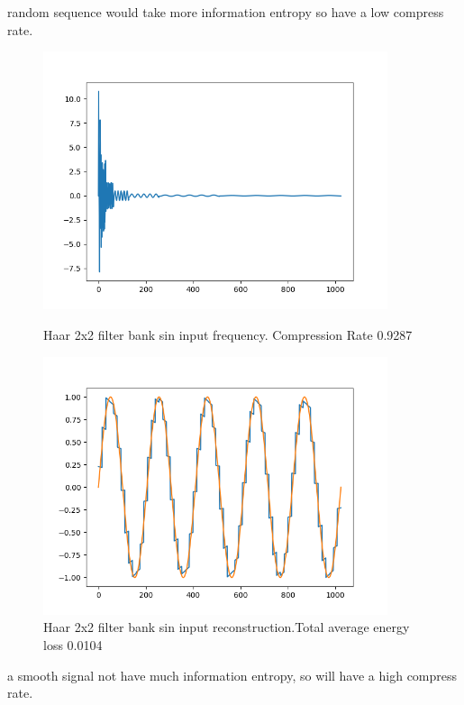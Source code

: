 \documentclass{article}
\theoremstyle{definition} %
\begin{document}
random sequence would take more information entropy so have a low compress rate.
\begin{figure}[ht!]
    \centering
    \begin{minipage}{0.45\textwidth}
        \centering
        \includegraphics[width=0.9\textwidth]{fig/HaarAugmented1D_sin_freq.png} %
        \caption{Haar 2x2 filter bank sin input frequency. Compression Rate 0.9287}
        \label{fig:Haar_sin}
    \end{minipage}\hfill
    \begin{minipage}{0.45\textwidth}
        \centering
        \includegraphics[width=0.9\textwidth]{fig/HaarAugmented1D_sin_rec.png} %
        \caption{Haar 2x2 filter bank sin input reconstruction.Total average energy loss 0.0104}
    \end{minipage}
\end{figure}
a smooth signal not have much information entropy, so will have a high compress rate.
\end{document}
